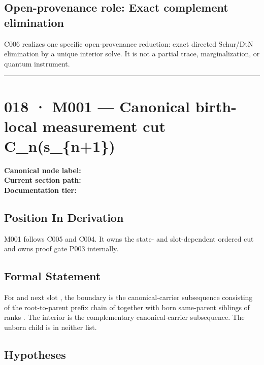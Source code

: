 \subsection{Open-provenance role: Exact complement
elimination}\label{open-provenance-role-exact-complement-elimination}

C006 realizes one specific open-provenance reduction: exact directed
Schur/DtN elimination by a unique interior solve. It is not a partial
trace, marginalization, or quantum instrument.

\begin{center}\rule{0.5\linewidth}{0.5pt}\end{center}

\section{018 · M001 --- Canonical birth-local measurement cut
C\_n(s\_\{n+1\})}\label{m001-canonical-birth-local-measurement-cut-c_ns_n1}

\textbf{Canonical node label:} \texttt{\protect{}}\\
\textbf{Current section path:} \texttt{\protect{}}\\
\textbf{Documentation tier:} \texttt{\protect{}}

\subsection{Position In Derivation}\label{position-in-derivation-14}

M001 follows C005 and C004. It owns the state- and slot-dependent
ordered cut and owns proof gate P003 internally.

\subsection{Formal Statement}\label{formal-statement-4}

For \texttt{\protect{}} and next slot \texttt{\protect{}}, the boundary is the
canonical-carrier subsequence consisting of the root-to-parent prefix
chain of \texttt{\protect{}} together with born same-parent siblings of ranks
\texttt{\protect{}}. The interior is the complementary
canonical-carrier subsequence. The unborn child \texttt{\protect{}} is in neither
list.

\subsection{Hypotheses}\label{hypotheses-4}

